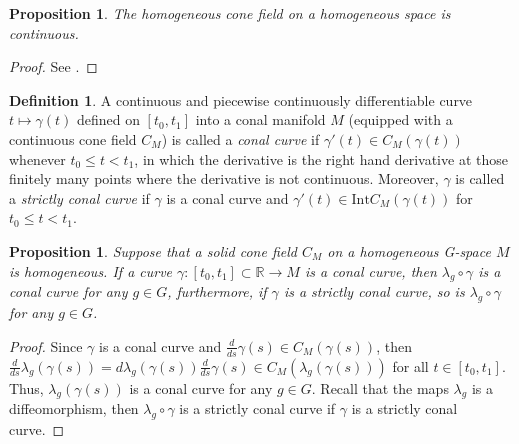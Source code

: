 \documentclass[a4paper,11pt]{article}
\theoremstyle{plain}
\newtheorem{prop}[thm]{Proposition}
\theoremstyle{definition}
\newtheorem{defn}[thm]{Definition}
\numberwithin{equation}{section}
\begin{document}
\begin{prop}\label{homogeneousconecontinuous}
	The homogeneous cone field on a homogeneous space is continuous.
\end{prop}
\begin{proof}
	See \cite[Proposition 4.6]{Lawson89}.
\end{proof}


\begin{defn}\label{conal-curve}
A continuous and piecewise continuously differentiable curve $t \mapsto \gamma(t)$ defined on $[t_0,t_1]$ into a conal manifold $M$ (equipped with a continuous cone field $C_M$) is called a \textit{conal curve} if $\gamma'(t)\in C_{M}(\gamma(t))$ whenever $t_0\leq t<t_1$, in which the derivative is the right hand derivative at those finitely many points where the derivative is not continuous. Moreover, $\gamma$ is called a \textit{strictly conal curve} if $\gamma$ is a conal curve and $\gamma'(t)\in \text{Int} C_{M}(\gamma(t))$ for $t_0\leq t<t_1$.
\end{defn}





\begin{prop}\label{groupkeepsorder}
	Suppose that a solid cone field $C_M$ on a homogeneous G-space $M$ is homogeneous. If a curve $\gamma \colon [t_0,t_1] \subset \mathbb{R} \to M$ is a conal curve, then $\lambda_g \circ \gamma$ is a conal curve for any $g\in G$, furthermore, if $\gamma$ is a strictly conal curve, so is $\lambda_g \circ \gamma$ for any $g\in G$.
\end{prop}
\begin{proof}
	Since $\gamma$ is a conal curve and $\frac{d}{ds}\gamma(s)\in C_{M}(\gamma(s))$, then $\frac{d}{ds}\lambda_g(\gamma(s))=d\lambda_g(\gamma(s))\frac{d}{ds}\gamma(s)\in C_{M}(\lambda_g(\gamma(s)))$ for all $t\in [t_0,t_1]$. Thus, $\lambda_g(\gamma(s))$ is a conal curve for any $g\in G$. Recall that the maps $\lambda_g$ is a diffeomorphism, then $\lambda_g \circ \gamma$ is a strictly conal curve if $\gamma$ is a strictly conal curve.
\end{proof}
\end{document}
